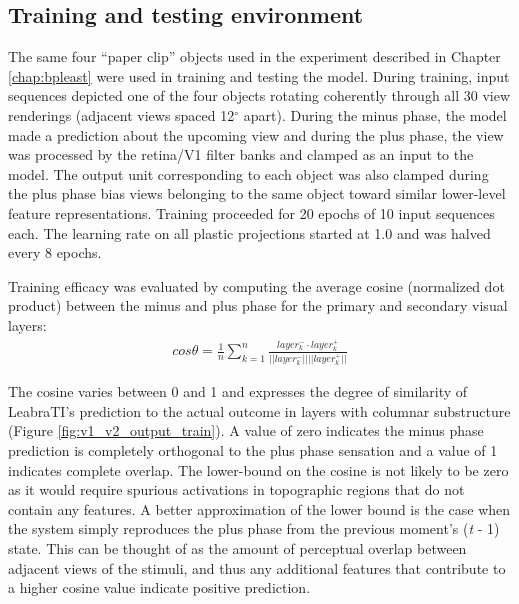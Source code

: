\documentclass[dwyatte_dissertation.tex]{subfiles}
\begin{document}
\subsection{Training and testing environment}
The same four ``paper clip'' objects used in the experiment described in Chapter \ref{chap:bpleast} were used in training and testing the model. During training, input sequences depicted one of the four objects rotating coherently through all 30 view renderings (adjacent views spaced 12$^\circ$ apart). During the minus phase, the model made a prediction about the upcoming view and during the plus phase, the view was processed by the retina/V1 filter banks and clamped as an input to the model. The output unit corresponding to each object was also clamped during the plus phase bias views belonging to the same object toward similar lower-level feature representations. Training proceeded for 20 epochs of 10 input sequences each. The learning rate on all plastic projections started at 1.0 and was halved every 8 epochs.

Training efficacy was evaluated by computing the average cosine (normalized dot product) between the minus and plus phase for the primary and secondary visual layers:
\begin{align*}
cos \theta = \frac{1}{n}\sum_{k=1}^{n}\frac{layer_k^- \cdot{} layer_k^+}{||layer_k^-||||layer_k^+||}
\end{align*}

The cosine varies between 0 and 1 and expresses the degree of similarity of LeabraTI's prediction to the actual outcome in layers with columnar substructure (Figure \ref{fig:v1_v2_output_train}). A value of zero indicates the minus phase prediction is completely orthogonal to the plus phase sensation and a value of 1 indicates complete overlap. The lower-bound on the cosine is not likely to be zero as it would require spurious activations in topographic regions that do not contain any features. A better approximation of the lower bound is the case when the system simply reproduces the plus phase from the previous moment's (\textit{t} - 1) state. This can be thought of as the amount of perceptual overlap between adjacent views of the stimuli, and thus any additional features that contribute to a higher cosine value indicate positive prediction.
\end{document}
